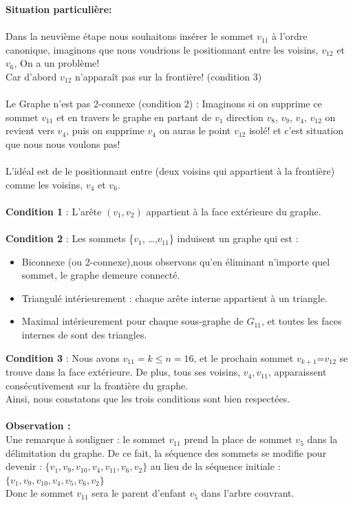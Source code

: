 \documentclass[hidelinks,letterpaper,12pt]{article}
\begin{document}
\textbf{Situation particulière:}
\\ \\
Dans la neuvième étape nous souhaitons insérer le sommet $v_{11}$ à l'ordre canonique, imaginons que nous voudrions le positionnant entre les voisins, $v_{12}$ et $v_6$, On a un problème! 
\\
Car d'abord $v_{12}$ n'apparaît pas sur la frontière! (condition 3) 
\\ \\
Le Graphe n'est pas 2-connexe (condition 2) : Imaginons si on supprime ce sommet $v_{11}$ et en travers le graphe en partant de $v_1$ direction $v_{8}$, $v_{9}$, $v_{4}$, $v_{12}$ on revient vers $v_{4}$, puis on supprime $v_{4}$ on auras le point $v_{12}$ isolé! et c'est situation que nous nous voulons pas!
\\ \\
L'idéal est de le positionnant entre (deux voisins qui appartient à la frontière) comme les voisins, $v_4$ et $v_6$.
\\ \\
\textbf{Condition 1} : L'arête \( (v_1,v_2) \) appartient à la face extérieure du graphe.
\\ \\
\textbf{Condition 2} : Les sommets \{$v_1$, \ldots ,$v_{11}$\} induisent un graphe qui est :
\begin{itemize}
\item Biconnexe (ou 2-connexe),nous observons qu'en éliminant n'importe quel sommet, le graphe demeure connecté.
\item Triangulé intérieurement : chaque arête interne appartient à un triangle.
\item Maximal intérieurement pour chaque sous-graphe de $G_{11}$, et toutes les faces internes de sont des triangles.
\\
\end{itemize}
\textbf{Condition 3} : Nous avons $v_{11}=k \leq n=16$, et le prochain sommet $v_{k+1}$=$v_{12}$ se trouve dans la face extérieure. De plus, tous ses voisins, \( v_4, v_11 \), apparaissent consécutivement sur la frontière du graphe.
\\
Ainsi, nous constatons que les trois conditions sont bien respectées.
\\ \\
\textbf{Observation :}
\\
Une remarque à souligner : le sommet $v_{11}$ prend la place de sommet $v_5$ dans la délimitation du graphe. De ce fait, la séquence des sommets se modifie pour devenir : \(\{v_1, v_9, v_{10}, v_4, v_{11}, v_6, v_2\}\) au lieu de la séquence initiale : \(\{v_1, v_9, v_{10}, v_4, v_5, v_6, v_2\}\)
\\
Donc le sommet \(v_{11}\) sera le parent d'enfant \(v_5\) dans l'arbre couvrant.
\end{document}
